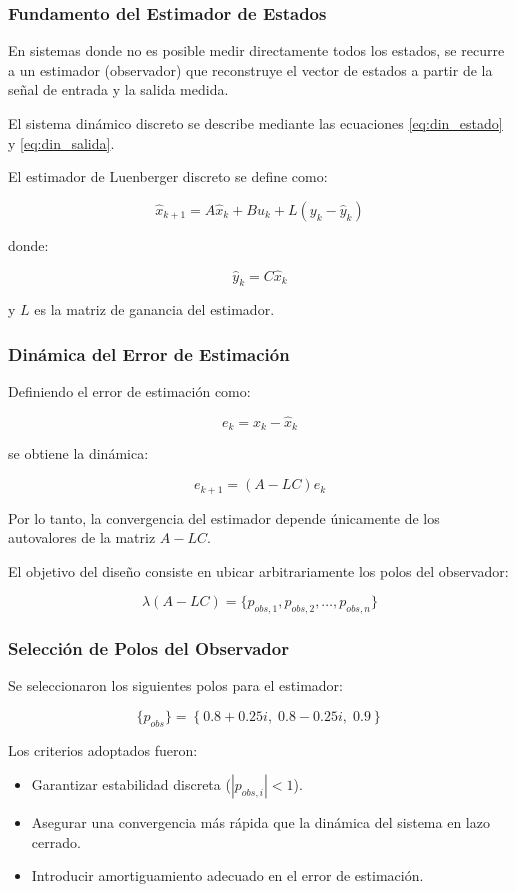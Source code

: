 \subsubsection{Fundamento del Estimador de Estados}

En sistemas donde no es posible medir directamente todos los estados,
se recurre a un estimador (observador) que reconstruye el vector de
estados a partir de la señal de entrada y la salida medida.

El sistema dinámico discreto se describe mediante las ecuaciones \ref{eq:din_estado} y \ref{eq:din_salida}.


El estimador de Luenberger discreto se define como:

\[
\hat{x}_{k+1} = A\hat{x}_k + B u_k + L (y_k - \hat{y}_k)
\]

donde:

\[
\hat{y}_k = C\hat{x}_k
\]

y \(L\) es la matriz de ganancia del estimador.

\subsubsection{Dinámica del Error de Estimación}

Definiendo el error de estimación como:

\[
e_k = x_k - \hat{x}_k
\]

se obtiene la dinámica:

\[
e_{k+1} = (A - LC)e_k
\]

Por lo tanto, la convergencia del estimador depende únicamente de los
autovalores de la matriz \(A - LC\).

El objetivo del diseño consiste en ubicar arbitrariamente los polos del
observador:

\[
\lambda(A - LC) = \{p_{obs,1}, p_{obs,2}, \dots, p_{obs,n}\}
\]

\subsubsection{Selección de Polos del Observador}

Se seleccionaron los siguientes polos para el estimador:

\[
\{p_{obs}\} =
\left\{
0.8 + 0.25i,\;
0.8 - 0.25i,\;
0.9
\right\}
\]

Los criterios adoptados fueron:

\begin{itemize}
	\item Garantizar estabilidad discreta ($|p_{obs,i}|<1$).
	\item Asegurar una convergencia más rápida que la dinámica del
	sistema en lazo cerrado.
	\item Introducir amortiguamiento adecuado en el error de estimación.
\end{itemize}

